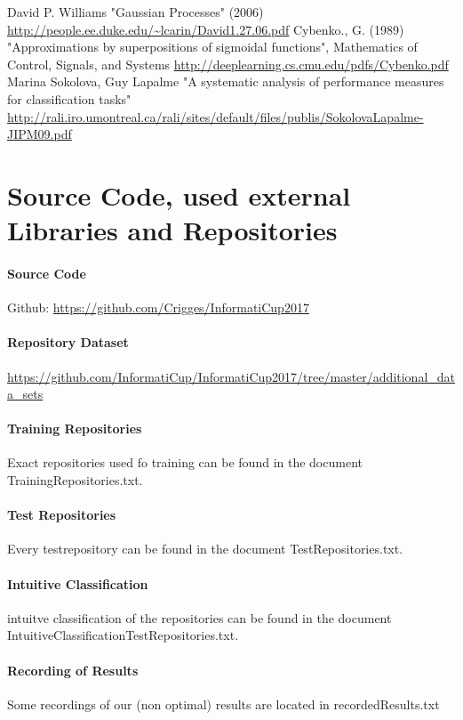 \documentclass[paper=A4,pagesize=auto,12pt,headinclude=true,footinclude=true,BCOR=0mm,DIV=calc]{scrartcl}
\begin{document}
	
	\newpage
	
	\begin{thebibliography}{xxxxxx}
		 David P. Williams "Gaussian Processes" (2006) \url{http://people.ee.duke.edu/~lcarin/David1.27.06.pdf}
		  Cybenko., G. (1989) "Approximations by superpositions of sigmoidal functions", Mathematics of Control, Signals, and Systems \url{http://deeplearning.cs.cmu.edu/pdfs/Cybenko.pdf}
		 Marina Sokolova, Guy Lapalme "A systematic analysis of performance measures for classification tasks" \url{http://rali.iro.umontreal.ca/rali/sites/default/files/publis/SokolovaLapalme-JIPM09.pdf}
	
	\end{thebibliography}
	
	
	\section{Source Code, used external Libraries and Repositories}
	\paragraph{Source Code}
	Github: \url{https://github.com/Crigges/InformatiCup2017}\\
	\paragraph{Repository Dataset}
	\label{src:Repositories}
	\url{https://github.com/InformatiCup/InformatiCup2017/tree/master/additional_data_sets}	\\
	
	\label{src:TrainingRepositories}
	\paragraph{Training Repositories}
	Exact repositories used fo training can be found in the document TrainingRepositories.txt.
	
	\label{src:TestRepositories}
	\paragraph{Test Repositories}
	Every testrepository can be found in the document TestRepositories.txt.
	\paragraph{Intuitive Classification}
	\label{src:ClassifyTestRepositories}
	intuitve classification of the repositories can be found in the document IntuitiveClassificationTestRepositories.txt.
	
	\label{src:recordingsOfResults}
	\paragraph{Recording of Results}
	Some recordings of our (non optimal) results are located in recordedResults.txt
	
	
\end{document}
